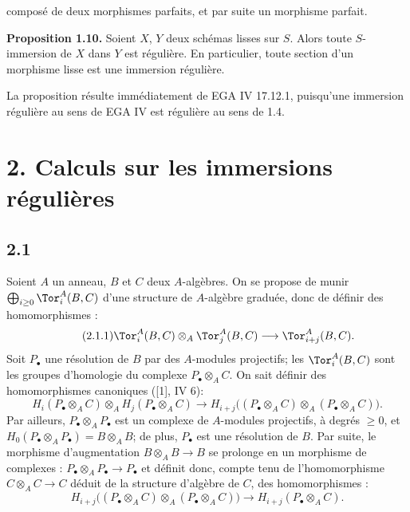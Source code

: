 composé de deux morphismes parfaits, et par suite un morphisme parfait.

\textbf{Proposition 1.10.} Soient \(X\), \(Y\) deux schémas lisses sur \(S\). Alors toute \(S\)-immersion de \(X\) dans \(Y\) est régulière. En particulier, toute section d'un morphisme lisse est une immersion régulière.

La proposition résulte immédiatement de EGA IV 17.12.1, puisqu'une immersion régulière au sens de EGA IV est régulière au sens de 1.4.

\section*{2. Calculs sur les immersions régulières}

\subsection*{2.1}
Soient \(A\) un anneau, \(B\) et \(C\) deux \(A\)-algèbres. On se propose de munir \(\bigoplus_{i\ge0}\Tor_i^A(B,C)\) d'une structure de \(A\)-algèbre graduée, donc de définir des homomorphismes :
\begin{equation}\tag{2.1.1}
 \Tor_i^A(B,C)\otimes_A\Tor_j^A(B,C)\longrightarrow \Tor_{i+j}^A(B,C).
\end{equation}
Soit \(P_\bullet\) une résolution de \(B\) par des \(A\)-modules projectifs; les \(\Tor_i^A(B,C)\) sont les groupes d'homologie du complexe \(P_\bullet\otimes_A C\). On sait définir des homomorphismes canoniques ([1], IV 6):
\begin{equation}\tag{2.1.2}
 H_i(P_\bullet\otimes_A C)\otimes_A H_j(P_\bullet\otimes_A C)
 \longrightarrow H_{i+j}\bigl((P_\bullet\otimes_A C)\otimes_A(P_\bullet\otimes_A C)\bigr).
\end{equation}
Par ailleurs, \(P_\bullet\otimes_A P_\bullet\) est un complexe de \(A\)-modules projectifs, à degrés \(\geq0\), et \(H_0(P_\bullet\otimes_A P_\bullet)=B\otimes_A B\); de plus, \(P_\bullet\) est une résolution de \(B\). Par suite, le morphisme d'augmentation \(B\otimes_A B\to B\) se prolonge en un morphisme de complexes : \(P_\bullet\otimes_A P_\bullet\to P_\bullet\) et définit donc, compte tenu de l'homomorphisme \(C\otimes_A C\to C\) déduit de la structure d'algèbre de \(C\), des homomorphismes :
\begin{equation}\tag{2.1.3}
 H_{i+j}\bigl((P_\bullet\otimes_A C)\otimes_A(P_\bullet\otimes_A C)\bigr)
 \longrightarrow H_{i+j}(P_\bullet\otimes_A C).
\end{equation}

